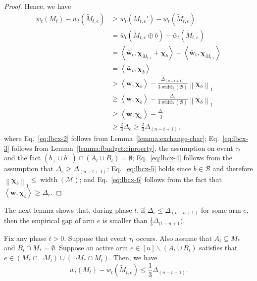 \documentclass{article}
\newcommand{\M}{\mathcal M}
\newcommand{\B}{\mathcal B}
\newcommand{\del}{\backslash}
\DeclareMathOperator{\rank}{width}
\newcommand{\inn}[1]{\left\langle #1 \right\rangle}
\newcommand{\nor}[1]{\left\|#1\right\|}
\renewcommand{\vec}[1]{\boldsymbol{#1}}
\begin{document}
\begin{proof}
Hence, we have
\begin{align}
\bar w_t(M_t) - \bar w_t(\tilde M_{t,e}) &\ge 
\bar w_t(M_{t,e}') - \bar w_t(\tilde M_{t,e}) \nonumber \\
&= \bar w_t(\tilde M_{t,e} \oplus b ) - \bar w_t(\tilde M_{t,e}) \nonumber \\
&= \inn{\vec {\bar w}_t, \vec\chi_{\tilde M_{t,e}}+\vec\chi_b}-\inn{\vec {\bar w}_t, \vec\chi_{\tilde M_{t,e}}} \label{eq:lbcx-2}\\
&= \inn{\vec {\bar w}_t, \vec\chi_b} \nonumber\\
&> \inn{\vec w, \vec\chi_b}-\frac{\Delta_{(n-t+1)}}{3\rank(\B)}\nor{\vec\chi_b}_1 \label{eq:lbcx-3}\\
&\ge \inn{\vec w, \vec\chi_b}-\frac{\Delta_e}{3\rank(\B)}\nor{\vec\chi_b}_1 \label{eq:lbcx-4}\\
&\ge \inn{\vec w, \vec\chi_b}-\frac{\Delta_e}{3}\label{eq:lbcx-5}\\
&\ge \frac{2}{3}\Delta_e \ge \frac{2}{3}\Delta_{(n-t+1)},\label{eq:lbcx-6}
\end{align}
where Eq.~\eqref{eq:lbcx-2} follows from Lemma~\ref{lemma:exchange-char};
Eq.~\eqref{eq:lbcx-3} follows from Lemma~\ref{lemma:fbudget:ciproerty}, the assumption on event $\tau_t$ and the fact $(b_+\cup b_-) \cap (A_t \cup B_t) = \emptyset$;
Eq.~\eqref{eq:lbcx-4} follows from the assumption that $\Delta_e \ge \Delta_{(n-t+1)}$;
Eq.~\eqref{eq:lbcx-5} holds since $b\in \B$ and therefore $\nor{\vec\chi_b}_1  \le \rank(\M)$;
and Eq.~\eqref{eq:lbcx-6} follows from the fact that $\inn{\vec w, \vec\chi_b} \ge \Delta_e$.
\end{proof}

The next lemma shows that, during phase $t$, if $\Delta_e \le \Delta_{(t-n+1)}$ for some arm $e$, then the empirical gap of arm $e$ is smaller than $\frac13 \Delta_{(t-n+1})$.
\begin{lemma}
\label{lemma-budget-e}
Fix any phase $t>0$. 
Suppose that event $\tau_t$ occurs.
Also assume that $A_t \subseteq M_*$ and $B_t \cap M_* = \emptyset$.
Suppose an active arm $e\in [n] \del (A_t\cup B_t)$  satisfies that $e\in (M_*\cap \neg M_t) \cup (\neg M_* \cap M_t)$. 
Then, we have
$$
\bar w_t(M_t) - \bar w_t(\tilde M_{t,e}) \le \frac{1}{3} \Delta_{(n-t+1)}.
$$
\end{lemma}
\end{document}
